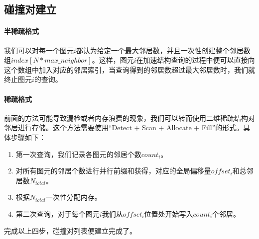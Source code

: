 \subsection{碰撞对建立}
\paragraph{半稀疏格式} 我们可以对每一个图元$i$都认为给定一个最大邻居数，并且一次性创建整个邻居数组$index [N * max\_neighbor]$。这样，图元$i$在加速结构查询的过程中便可以直接向这个数组中加入对应的邻居索引，当查询得到的邻居数超过最大邻居数时，我们就终止图元$i$的查询。
\paragraph{稀疏格式} 前面的方法可能导致漏检或者内存浪费的现象，我们可以转而使用二维稀疏结构对邻居进行存储。这个方法需要使用“Detect + Scan + Allocate + Fill”的形式。具体步骤如下：
\begin{enumerate}
	\item 第一次查询，我们记录各图元的邻居个数$count_i$。
	\item 对所有图元的邻居个数进行并行前缀和获得，对应的全局偏移量$offset_i$和总邻居数$N_{total}$。
	\item 根据$N_{total}$一次性分配内存。
	\item 第二次查询，对于每个图元$i$我们从$offset_i$位置处开始写入$count_i$个邻居。
\end{enumerate}
完成以上四步，碰撞对列表便建立完成了。